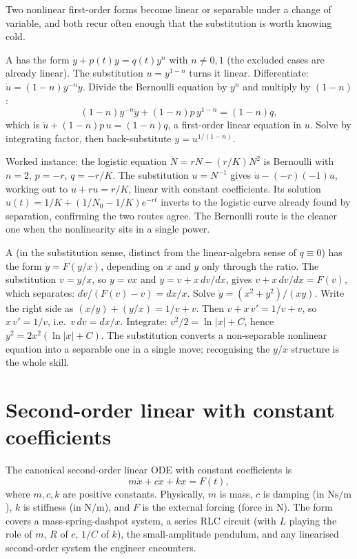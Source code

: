 Two nonlinear first-order forms become linear or separable under a
change of variable, and both recur often enough that the substitution
is worth knowing cold.

A  has the form $\dot{y} + p(t) y =
q(t) y^{n}$ with $n \neq 0, 1$ (the excluded cases are already
linear). The substitution $u = y^{1-n}$ turns it linear. Differentiate:
$\dot{u} = (1 - n) y^{-n} \dot{y}$. Divide the Bernoulli equation by
$y^{n}$ and multiply by $(1 - n)$:
\[
(1 - n) y^{-n} \dot{y} + (1 - n) p\, y^{1-n} = (1 - n) q,
\]
which is $\dot{u} + (1 - n) p\, u = (1 - n) q$, a first-order linear
equation in $u$. Solve by integrating factor, then back-substitute
$y = u^{1/(1-n)}$.

Worked instance: the logistic equation $\dot{N} = r N - (r/K) N^{2}$
is Bernoulli with $n = 2$, $p = -r$, $q = -r/K$. The substitution
$u = N^{-1}$ gives $\dot{u} - (-r)(-1) u$, working out to
$\dot{u} + r u = r/K$, linear with constant coefficients. Its
solution $u(t) = 1/K + (1/N_{0} - 1/K) e^{-r t}$ inverts to the
logistic curve already found by separation, confirming the two
routes agree. The Bernoulli route is the cleaner one when the
nonlinearity sits in a single power.

A  (in the substitution sense, distinct
from the linear-algebra sense of $q \equiv 0$) has the form
$\dot{y} = F(y/x)$, depending on $x$ and $y$ only through the ratio.
The substitution $v = y/x$, so $y = vx$ and $\dot{y} = v + x\,
dv/dx$, gives $v + x\, dv/dx = F(v)$, which separates:
$dv/(F(v) - v) = dx/x$. Solve $\dot{y} = (x^{2} + y^{2})/(xy)$. Write
the right side as $(x/y) + (y/x) = 1/v + v$. Then $v + x\, v' = 1/v +
v$, so $x\, v' = 1/v$, i.e.\ $v\, dv = dx/x$. Integrate:
$v^{2}/2 = \ln|x| + C$, hence $y^{2} = 2x^{2}(\ln|x| + C)$. The
substitution converts a non-separable nonlinear equation into a
separable one in a single move; recognising the $y/x$ structure is
the whole skill.

\section{Second-order linear with constant coefficients}

The canonical second-order linear ODE with constant coefficients is
\[
m \ddot{x} + c \dot{x} + k x = F(t),
\]
where $m, c, k$ are positive constants. Physically, $m$ is mass, $c$
is damping (in $\si{\newton\second\per\meter}$), $k$ is stiffness
(in $\si{\newton\per\meter}$), and $F$ is the external forcing
(force in $\si{\newton}$). The form covers a mass-spring-dashpot
system, a series RLC circuit (with $L$ playing the role of $m$, $R$
of $c$, $1/C$ of $k$), the small-amplitude pendulum, and any
linearised second-order system the engineer encounters.


